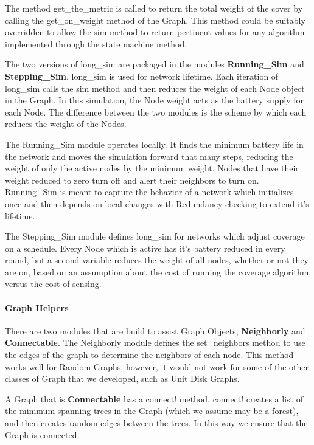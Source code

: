 \documentclass[technote, 10pt, letter]{IEEEtran}
\begin{document}
The method {\ttfamily get\_the\_metric} is called to return the total weight of the cover by calling the {\ttfamily get\_on\_weight} method of the Graph. This method could be suitably overridden to allow the {\ttfamily sim} method to return pertinent values for any algorithm implemented through the state machine method.

The two versions of {\ttfamily long\_sim} are packaged in the modules {\bfseries Running\_Sim} and {\bfseries Stepping\_Sim}. {\ttfamily long\_sim} is used for network lifetime. Each iteration of {\ttfamily long\_sim} calls the {\ttfamily sim} method and then reduces the weight of each Node object in the Graph. In this simulation, the Node weight acts as the battery supply for each Node. The difference between the two modules is the scheme by which each reduces the weight of the Nodes.

The Running\_Sim module operates locally. It finds the minimum battery life in the network and moves the simulation forward that many steps, reducing the weight of only the active nodes by the minimum weight. Nodes that have their weight reduced to zero turn off and alert their neighbors to turn on. Running\_Sim is meant to capture the behavior of a network which initializes once and then depends on local changes with Redundancy checking to extend it's lifetime.

The Stepping\_Sim module defines {\ttfamily long\_sim} for networks which adjust coverage on a schedule. Every Node which is active has it's battery reduced in every round, but a second variable reduces the weight of all nodes, whether or not they are on, based on an assumption about the cost of running the coverage algorithm versus the cost of sensing.

\paragraph{Graph Helpers}

There are two modules that are build to assist Graph Objects, {\bfseries Neighborly} and {\bfseries Connectable}. The Neighborly module defines the {\ttfamily set\_neighbors} method to use the edges of the graph to determine the neighbors of each node. This method works well for Random Graphs, however, it would not work for some of the other classes of Graph that we developed, such as Unit Disk Graphs. 

A Graph that is {\bfseries Connectable} has a {\ttfamily connect!} method. {\ttfamily connect!} creates a list of the minimum spanning trees in the Graph (which we assume may be a forest), and then creates random edges between the trees. In this way we ensure that the Graph is connected.
\end{document}
